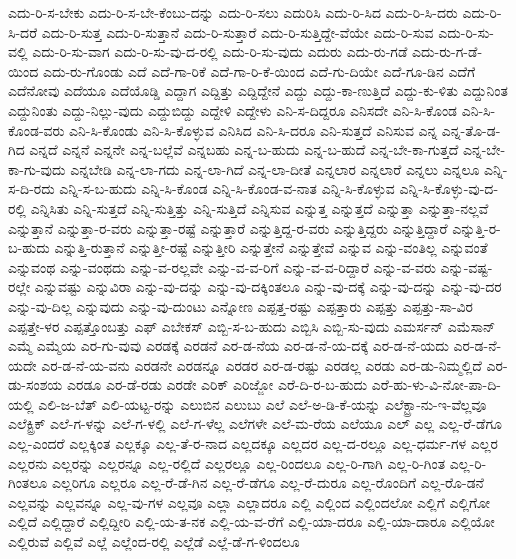 {ಎದು-ರಿ-ಸ-ಬೇಕು
ಎದು-ರಿ-ಸ-ಬೇ-ಕೆಂಬು-ದನ್ನು
ಎದು-ರಿ-ಸಲು
ಎದುರಿಸಿ
ಎದು-ರಿ-ಸಿದ
ಎದು-ರಿ-ಸಿ-ದರು
ಎದು-ರಿ-ಸಿ-ದರೆ
ಎದು-ರಿ-ಸುತ್ತ
ಎದು-ರಿ-ಸುತ್ತಾನೆ
ಎದು-ರಿ-ಸುತ್ತಾರೆ
ಎದು-ರಿ-ಸುತ್ತಿದ್ದೇ-ವೆಯೇ
ಎದು-ರಿ-ಸುವ
ಎದು-ರಿ-ಸು-ವಲ್ಲಿ
ಎದು-ರಿ-ಸು-ವಾಗ
ಎದು-ರಿ-ಸು-ವು-ದ-ರಲ್ಲಿ
ಎದು-ರಿ-ಸು-ವುದು
ಎದುರು
ಎದು-ರು-ಗಡೆ
ಎದು-ರು-ಗ-ಡೆ-ಯಿಂದ
ಎದು-ರು-ಗೊಂಡು
ಎದೆ
ಎದೆ-ಗಾ-ರಿಕೆ
ಎದೆ-ಗಾ-ರಿ-ಕೆ-ಯಿಂದ
ಎದೆ-ಗು-ದಿಯೇ
ಎದೆ-ಗೂ-ಡಿನ
ಎದೆಗೆ
ಎದೆನೋವು
ಎದೆಯೂ
ಎದೆಯೊಡ್ಡಿ
ಎದ್ದಾಗ
ಎದ್ದಿತ್ತು
ಎದ್ದಿದ್ದೇನೆ
ಎದ್ದು
ಎದ್ದು-ಕಾ-ಣುತ್ತಿದೆ
ಎದ್ದು-ಕು-ಳಿತು
ಎದ್ದುನಿಂತ
ಎದ್ದುನಿಂತು
ಎದ್ದು-ನಿಲ್ಲು-ವುದು
ಎದ್ದುಬಿದ್ದು
ಎದ್ದೇಳಿ
ಎದ್ದೇಳು
ಎನಿ-ಸ-ದಿದ್ದರೂ
ಎನಿಸದೇ
ಎನಿ-ಸಿ-ಕೊಂಡ
ಎನಿ-ಸಿ-ಕೊಂಡ-ವರು
ಎನಿ-ಸಿ-ಕೊಂಡು
ಎನಿ-ಸಿ-ಕೊಳ್ಳುವ
ಎನಿಸಿದ
ಎನಿ-ಸಿ-ದರೂ
ಎನಿ-ಸುತ್ತದೆ
ಎನಿಸುವ
ಎನ್ನ
ಎನ್ನ-ತೊ-ಡ-ಗಿದ
ಎನ್ನದೆ
ಎನ್ನನೆ
ಎನ್ನನೇ
ಎನ್ನ-ಬಲ್ಲೆವೆ
ಎನ್ನಬಹು
ಎನ್ನ-ಬ-ಹುದು
ಎನ್ನ-ಬ-ಹುದೆ
ಎನ್ನ-ಬೇ-ಕಾ-ಗುತ್ತದೆ
ಎನ್ನ-ಬೇ-ಕಾ-ಗು-ವುದು
ಎನ್ನಬೇಡಿ
ಎನ್ನ-ಲಾ-ಗದು
ಎನ್ನ-ಲಾ-ಗಿದೆ
ಎನ್ನ-ಲಾ-ದೀತೆ
ಎನ್ನಲಾರ
ಎನ್ನಲಾರೆ
ಎನ್ನಲು
ಎನ್ನಲೂ
ಎನ್ನಿ-ಸ-ದಿ-ರದು
ಎನ್ನಿ-ಸ-ಬ-ಹುದು
ಎನ್ನಿ-ಸಿ-ಕೊಂಡ
ಎನ್ನಿ-ಸಿ-ಕೊಂಡ-ವ-ನಾತ
ಎನ್ನಿ-ಸಿ-ಕೊಳ್ಳುವ
ಎನ್ನಿ-ಸಿ-ಕೊಳ್ಳು-ವು-ದ-ರಲ್ಲಿ
ಎನ್ನಿಸಿತು
ಎನ್ನಿ-ಸುತ್ತದೆ
ಎನ್ನಿ-ಸುತ್ತಿತ್ತು
ಎನ್ನಿ-ಸುತ್ತಿದೆ
ಎನ್ನಿಸುವ
ಎನ್ನುತ್ತ
ಎನ್ನುತ್ತದೆ
ಎನ್ನುತ್ತಾ
ಎನ್ನುತ್ತಾ-ನಲ್ಲವೆ
ಎನ್ನುತ್ತಾನೆ
ಎನ್ನುತ್ತಾ-ರ-ವರು
ಎನ್ನುತ್ತಾ-ರಷ್ಟೆ
ಎನ್ನುತ್ತಾರೆ
ಎನ್ನುತ್ತಿದ್ದ-ರ-ವರು
ಎನ್ನುತ್ತಿದ್ದರು
ಎನ್ನುತ್ತಿದ್ದಾರೆ
ಎನ್ನುತ್ತಿ-ರ-ಬ-ಹುದು
ಎನ್ನುತ್ತಿ-ರುತ್ತಾನೆ
ಎನ್ನುತ್ತೀ-ರಷ್ಟೆ
ಎನ್ನುತ್ತೀರಿ
ಎನ್ನುತ್ತೇನೆ
ಎನ್ನುತ್ತೇವೆ
ಎನ್ನುವ
ಎನ್ನು-ವಂತಿಲ್ಲ
ಎನ್ನುವಂತೆ
ಎನ್ನುವಂಥ
ಎನ್ನು-ವಂಥದು
ಎನ್ನು-ವ-ರಲ್ಲವೇ
ಎನ್ನು-ವ-ವ-ರಿಗೆ
ಎನ್ನು-ವ-ವ-ರಿದ್ದಾರೆ
ಎನ್ನು-ವ-ವರು
ಎನ್ನು-ವಷ್ಟ-ರಲ್ಲೇ
ಎನ್ನುವಷ್ಟು
ಎನ್ನುವಿರಾ
ಎನ್ನು-ವು-ದನ್ನು
ಎನ್ನು-ವು-ದಕ್ಕಿಂತಲೂ
ಎನ್ನು-ವು-ದಕ್ಕೆ
ಎನ್ನು-ವು-ದನ್ನು
ಎನ್ನು-ವು-ದರ
ಎನ್ನು-ವು-ದಿಲ್ಲ
ಎನ್ನುವುದು
ಎನ್ನು-ವು-ದುಂಟು
ಎನ್ನೋಣ
ಎಪ್ಪತ್ತ-ರಷ್ಟು
ಎಪ್ಪತ್ತಾರು
ಎಪ್ಪತ್ತು
ಎಪ್ಪತ್ತು-ಸಾ-ವಿರ
ಎಪ್ಪತ್ತೇ-ಳರ
ಎಪ್ಪತ್ತೊಂಬತ್ತು
ಎಫ್
ಎಬೇಕಸ್
ಎಬ್ಬಿ-ಸ-ಬ-ಹುದು
ಎಬ್ಬಿಸಿ
ಎಬ್ಬಿ-ಸು-ವುದು
ಎಮರ್ಸನ್
ಎಮೆಸಾನ್
ಎಮ್ಮೆ
ಎಮ್ಮೆಯ
ಎರ-ಗು-ವುವು
ಎರಡಕ್ಕೆ
ಎರಡನೆ
ಎರ-ಡ-ನೆಯ
ಎರ-ಡ-ನೆ-ಯ-ದಕ್ಕೆ
ಎರ-ಡ-ನೆ-ಯದು
ಎರ-ಡ-ನೆ-ಯದೇ
ಎರ-ಡ-ನೆ-ಯ-ವನು
ಎರಡನೇ
ಎರಡನ್ನೂ
ಎರಡರ
ಎರ-ಡ-ರಷ್ಟು
ಎರಡಲ್ಲ
ಎರಡು
ಎರ-ಡು-ನಿಮ್ಮಲ್ಲಿದೆ
ಎರ-ಡು-ಸಂಶಯ
ಎರಡೂ
ಎರ-ಡೆ-ರಡು
ಎರಡೇ
ಎರಿಕ್
ಎರಿಜ್ಜೋ
ಎರೆ-ದಿ-ರ-ಬ-ಹುದು
ಎರೆ-ಹು-ಳು-ವಿ-ನೋ-ಪಾ-ದಿ-ಯಲ್ಲಿ
ಎಲಿ-ಜ-ಬೆತ್
ಎಲಿ-ಯಟ್ಟ-ರನ್ನು
ಎಲುಬಿನ
ಎಲುಬು
ಎಲೆ
ಎಲೆ-ಅ-ಡಿ-ಕೆ-ಯನ್ನು
ಎಲೆಕ್ಟ್ರಾ-ನು-ಇ-ವೆಲ್ಲವೂ
ಎಲೆಕ್ಟ್ರಿಕ್
ಎಲೆ-ಗ-ಳನ್ನು
ಎಲೆ-ಗ-ಳಲ್ಲಿ
ಎಲೆ-ಗ-ಳೆಲ್ಲ
ಎಲೆಗಳೇ
ಎಲೆ-ಮ-ರೆಯ
ಎಲೆಯೂ
ಎಲ್
ಎಲ್ಲ
ಎಲ್ಲ-ರೆ-ಡೆಗೂ
ಎಲ್ಲ-ಎಂದರೆ
ಎಲ್ಲಕ್ಕಿಂತ
ಎಲ್ಲಕ್ಕೂ
ಎಲ್ಲ-ತೆ-ರ-ನಾದ
ಎಲ್ಲದಕ್ಕೂ
ಎಲ್ಲದರ
ಎಲ್ಲ-ದ-ರಲ್ಲೂ
ಎಲ್ಲ-ಧರ್ಮ-ಗಳ
ಎಲ್ಲರ
ಎಲ್ಲರನು
ಎಲ್ಲರನ್ನು
ಎಲ್ಲರನ್ನೂ
ಎಲ್ಲ-ರಲ್ಲಿದೆ
ಎಲ್ಲರಲ್ಲೂ
ಎಲ್ಲ-ರಿಂದಲೂ
ಎಲ್ಲ-ರಿ-ಗಾಗಿ
ಎಲ್ಲ-ರಿ-ಗಿಂತ
ಎಲ್ಲ-ರಿ-ಗಿಂತಲೂ
ಎಲ್ಲರಿಗೂ
ಎಲ್ಲರೂ
ಎಲ್ಲ-ರೆ-ಡೆ-ಗಿನ
ಎಲ್ಲ-ರೆ-ಡೆಗೂ
ಎಲ್ಲ-ರೆ-ದುರೂ
ಎಲ್ಲ-ರೊಂದಿಗೆ
ಎಲ್ಲ-ರೊ-ಡನೆ
ಎಲ್ಲವನ್ನು
ಎಲ್ಲವನ್ನೂ
ಎಲ್ಲ-ವು-ಗಳ
ಎಲ್ಲವೂ
ಎಲ್ಲಾ
ಎಲ್ಲಾದರೂ
ಎಲ್ಲಿ
ಎಲ್ಲಿಂದ
ಎಲ್ಲಿಂದಲೋ
ಎಲ್ಲಿಗೆ
ಎಲ್ಲಿಗೋ
ಎಲ್ಲಿದೆ
ಎಲ್ಲಿದ್ದಾರೆ
ಎಲ್ಲಿದ್ದೀರಿ
ಎಲ್ಲಿ-ಯ-ತ-ನಕ
ಎಲ್ಲಿ-ಯ-ವ-ರೆಗೆ
ಎಲ್ಲಿ-ಯಾ-ದರೂ
ಎಲ್ಲಿ-ಯಾ-ದಾರೂ
ಎಲ್ಲಿಯೋ
ಎಲ್ಲಿರುವೆ
ಎಲ್ಲಿವೆ
ಎಲ್ಲೆ
ಎಲ್ಲೆಂದ-ರಲ್ಲಿ
ಎಲ್ಲೆಡೆ
ಎಲ್ಲೆ-ಡೆ-ಗ-ಳಿಂದಲೂ
}
